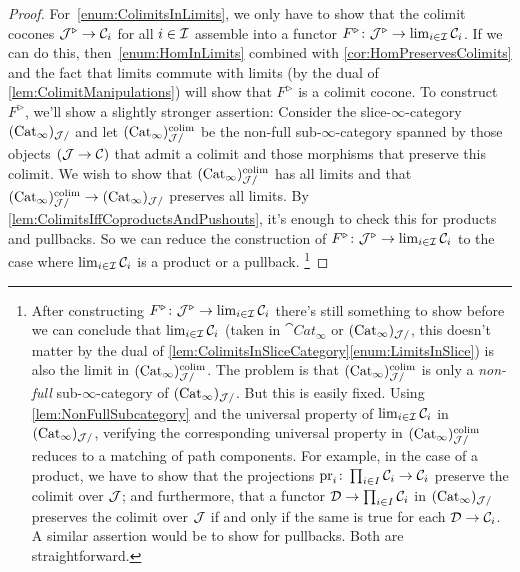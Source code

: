\begin{proof}
	For~\cref{enum:ColimitsInLimits}, we only have to show that the colimit cocones $\mathcal{J}^\triangleright \rightarrow \mathcal{C}_i$ for all $i\in \mathcal{I}$ assemble into a functor $F^\triangleright\colon \mathcal{J}^\triangleright\rightarrow \operatorname*{lim}_{i\in \mathcal{I}}\mathcal{C}_i$. If we can do this, then~\cref{enum:HomInLimits} combined with \cref{cor:HomPreservesColimits} and the fact that limits commute with limits (by the dual of \cref{lem:ColimitManipulations}) will show that $F^\triangleright$ is a colimit cocone. To construct $F^\triangleright$, we'll show a slightly stronger assertion: Consider the slice-$\infty$-category $(\mathrm{Cat}_\infty)_{\mathcal{J}/}$ and let $(\mathrm{Cat}_\infty)_{\mathcal{J}/}^{\operatorname*{colim}}$ be the non-full sub-$\infty$-category spanned by those objects $(\mathcal{J}\rightarrow \mathcal{C})$ that admit a colimit and those morphisms that preserve this colimit. We wish to show that $(\mathrm{Cat}_\infty)_{\mathcal{J}/}^{\operatorname*{colim}}$ has all limits and that $(\mathrm{Cat}_\infty)_{\mathcal{J}/}^{\operatorname*{colim}}\rightarrow(\mathrm{Cat}_\infty)_{\mathcal{J}/}$ preserves all limits. By \cref{lem:ColimitsIffCoproductsAndPushouts}, it's enough to check this for products and pullbacks. So we can reduce the construction of $F^\triangleright\colon \mathcal{J}^\triangleright\rightarrow \operatorname*{lim}_{i\in\mathcal{I}}\mathcal{C}_i$ to the case where $\operatorname*{lim}_{i\in\mathcal{I}}\mathcal{C}_i$ is a product or a pullback.%
	\footnote{\label{footnote:LimitNonFullSubcategory}After constructing $F^\triangleright\colon \mathcal{J}^\triangleright\rightarrow \operatorname*{lim}_{i\in\mathcal{I}}\mathcal{C}_i$ there's still something to show before we can conclude that $\operatorname*{lim}_{i\in\mathcal{I}}\mathcal{C}_i$ (taken in $\cat{Cat}_\infty$ or $(\mathrm{Cat}_\infty)_{\mathcal{J}/}$, this doesn't matter by the dual of \cref{lem:ColimitsInSliceCategory}\cref{enum:LimitsInSlice}) is also the limit in $(\mathrm{Cat}_\infty)_{\mathcal{J}/}^{\operatorname*{colim}}$. The problem is that $(\mathrm{Cat}_\infty)_{\mathcal{J}/}^{\operatorname*{colim}}$ is only a \emph{non-full} sub-$\infty$-category of $(\mathrm{Cat}_\infty)_{\mathcal{J}/}$. But this is easily fixed. Using \cref{lem:NonFullSubcategory} and the universal property of $\operatorname*{lim}_{i\in\mathcal{I}}\mathcal{C}_i$ in $(\mathrm{Cat}_\infty)_{\mathcal{J}/}$, verifying the corresponding universal property in $(\mathrm{Cat}_\infty)_{\mathcal{J}/}^{\operatorname*{colim}}$ reduces to a matching of path components. For example, in the case of a product, we have to show that the projections $\operatorname{pr}_i\colon \prod_{i\in I}\mathcal{C}_i\rightarrow \mathcal{C}_i$ preserve the colimit over $\mathcal{J}$; and furthermore, that a functor $\mathcal{D}\rightarrow \prod_{i\in I}\mathcal{C}_i$ in $(\mathrm{Cat}_\infty)_{\mathcal{J}/}$ preserves the colimit over $\mathcal{J}$ if and only if the same is true for each $\mathcal{D}\rightarrow \mathcal{C}_i$. A similar assertion would be to show for pullbacks. Both are straightforward.}
	

\end{proof}
